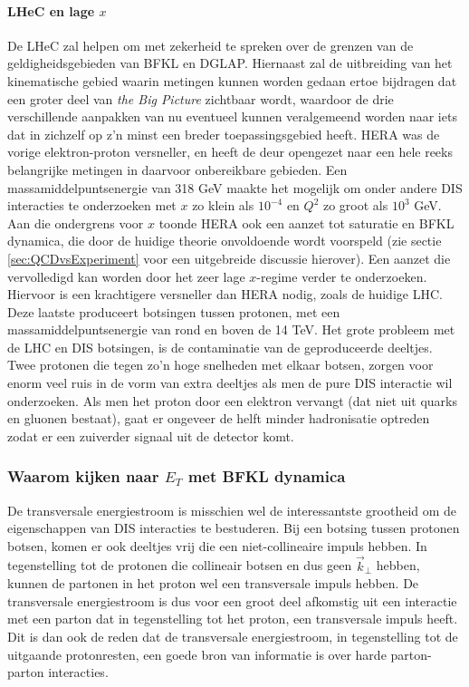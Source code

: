\documentclass[a4paper,11pt]{article}
\numberwithin{equation}{section} %
\begin{document}
      \paragraph{LHeC en lage $x$}
De LHeC zal helpen om met zekerheid te spreken over de grenzen van de geldigheidsgebieden van BFKL en DGLAP.
Hiernaast zal de uitbreiding van het kinematische gebied waarin metingen kunnen worden gedaan ertoe bijdragen dat een groter deel van \textit{the Big Picture} zichtbaar wordt, waardoor de drie verschillende aanpakken van nu eventueel kunnen veralgemeend worden naar iets dat in zichzelf op z’n minst een breder toepassingsgebied heeft.
HERA was de vorige elektron-proton versneller, en heeft de deur opengezet naar een hele reeks belangrijke metingen in daarvoor onbereikbare gebieden.
Een massamiddelpuntsenergie van 318 GeV maakte het mogelijk om onder andere DIS  interacties te onderzoeken met $x$ zo klein als $10^{-4}$ en $Q^2$ zo groot als $10^3$ GeV.
Aan die ondergrens voor $x$ toonde HERA ook een aanzet tot saturatie en BFKL dynamica, die door de huidige theorie onvoldoende wordt voorspeld (zie sectie \ref{sec:QCDvsExperiment} voor een uitgebreide discussie hierover).
Een aanzet die vervolledigd kan worden door het zeer lage $x$-regime verder te onderzoeken.
Hiervoor is een krachtigere versneller dan HERA nodig, zoals de huidige LHC.
Deze laatste produceert botsingen tussen protonen, met een massamiddelpuntsenergie van rond en boven de 14 TeV.
Het grote probleem met de LHC en DIS botsingen, is de contaminatie van de geproduceerde deeltjes.
Twee protonen die tegen zo’n hoge snelheden met elkaar botsen, zorgen voor enorm veel ruis in de vorm van extra deeltjes als men de pure DIS interactie wil onderzoeken.
Als men het proton door een elektron vervangt (dat niet uit quarks en gluonen bestaat), gaat er ongeveer de helft minder hadronisatie optreden zodat er een zuiverder signaal uit de detector komt.

    \subsubsection{Waarom kijken naar $E_T$ met BFKL dynamica}
De transversale energiestroom is misschien wel de interessantste grootheid om de eigenschappen van DIS interacties te bestuderen.
Bij een botsing tussen protonen botsen, komen er ook deeltjes vrij die een niet-collineaire impuls hebben.
In tegenstelling tot de protonen die collineair botsen en dus geen $\vec{k}_\perp$ hebben, kunnen de partonen in het proton wel een transversale impuls hebben.
De transversale energiestroom is dus voor een groot deel afkomstig uit een interactie met een parton dat in tegenstelling tot het proton, een transversale impuls heeft.
Dit is dan ook de reden dat de transversale energiestroom, in tegenstelling tot de uitgaande protonresten, een goede bron van informatie is over harde parton-parton interacties.
\end{document}
